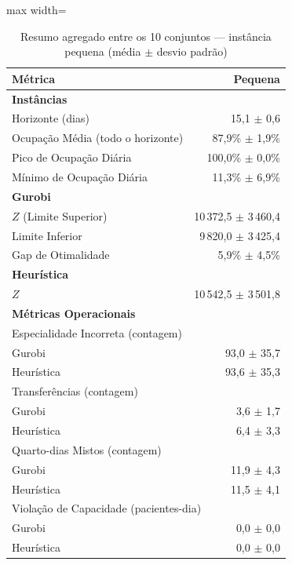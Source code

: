 \begin{table}[htbp]
    \caption{Resumo agregado entre os 10 conjuntos --- instância pequena (média $\pm$ desvio padrão)}
    \label{tab:agregado-pequeno}
    \centering
    \begin{adjustbox}{max width=\textwidth}
    \begin{tabular}{lr}
        \hline
        \textbf{Métrica} & \textbf{Pequena} \\
        \hline
        \multicolumn{2}{l}{\textbf{Instâncias}} \\
        Horizonte (dias) & 15,1 $\pm$ 0,6 \\
        Ocupação Média (todo o horizonte) & 87,9\% $\pm$ 1,9\% \\
        Pico de Ocupação Diária & 100,0\% $\pm$ 0,0\% \\
        Mínimo de Ocupação Diária & 11,3\% $\pm$ 6,9\% \\
        \hline
        \multicolumn{2}{l}{\textbf{Gurobi}} \\
        $Z$ (Limite Superior) & 10\,372,5 $\pm$ 3\,460,4 \\
        Limite Inferior & 9\,820,0 $\pm$ 3\,425,4 \\
        Gap de Otimalidade & 5,9\% $\pm$ 4,5\% \\
        \hline
        \multicolumn{2}{l}{\textbf{Heurística}} \\
        $Z$ & 10\,542,5 $\pm$ 3\,501,8 \\
        \hline
        \multicolumn{2}{l}{\textbf{Métricas Operacionais}} \\
        \multicolumn{2}{l}{Especialidade Incorreta (contagem)} \\
        \quad Gurobi & 93,0 $\pm$ 35,7 \\
        \quad Heurística & 93,6 $\pm$ 35,3 \\
        \multicolumn{2}{l}{Transferências (contagem)} \\
        \quad Gurobi & 3,6 $\pm$ 1,7 \\
        \quad Heurística & 6,4 $\pm$ 3,3 \\
        \multicolumn{2}{l}{Quarto-dias Mistos (contagem)} \\
        \quad Gurobi & 11,9 $\pm$ 4,3 \\
        \quad Heurística & 11,5 $\pm$ 4,1 \\
        \multicolumn{2}{l}{Violação de Capacidade (pacientes-dia)} \\
        \quad Gurobi & 0,0 $\pm$ 0,0 \\
        \quad Heurística & 0,0 $\pm$ 0,0 \\
        \hline
    \end{tabular}
    \end{adjustbox}
\end{table}

